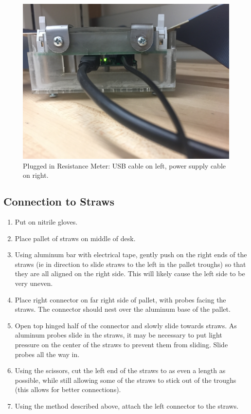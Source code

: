\documentclass[letterpaper,12pt]{article}
\begin{document}
\begin{figure}[h]
	\centering
	\includegraphics[width=\textwidth , angle=180]{resistance_box_plugged2}
	\caption{Plugged in Resistance Meter: USB cable on left, power supply cable on right.}
\end{figure}

\subsection{Connection to Straws}
\begin{enumerate}
	\item Put on nitrile gloves.
	\item Place pallet of straws on middle of desk.
	\item Using aluminum bar with electrical tape, gently push on the right ends of the straws (ie in direction to slide straws to the left in the pallet troughs) so that they are all aligned on the right side. This will likely cause the left side to be very uneven.
	\item Place right connector on far right side of pallet, with probes facing the straws. The connector should nest over the aluminum base of the pallet.
	\item Open top hinged half of the connector and slowly slide towards straws. As aluminum probes slide in the straws, it may be necessary to put light pressure on the center of the straws to prevent them from sliding. Slide probes all the way in.
	\item Using the scissors, cut the left end of the straws to as even a length as possible, while still allowing some of the straws to stick out of the troughs (this allows for better connections).
	\item Using the method described above, attach the left connector to the straws.
\end{enumerate}
\end{document}
